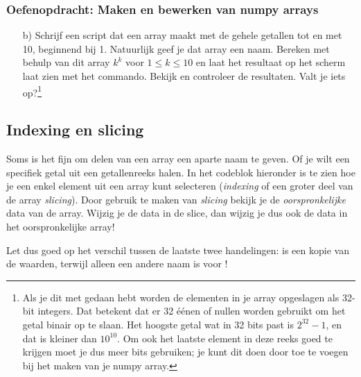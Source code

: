 \documentclass[a4paper,11pt, fleqn]{article}
\begin{document}
\subsubsection*{Oefenopdracht: Maken en bewerken van numpy arrays}
\begin{itemize}
	\item[b)] Schrijf een script dat een array maakt met de gehele getallen tot en met 10, beginnend bij 1. Natuurlijk geef je dat array een naam. Bereken met behulp van dit array $k^k$ voor $1\leq k \leq 10$ en laat het resultaat op het scherm laat zien met het  commando. Bekijk en controleer de resultaten. Valt je iets op?\footnote{Als je dit met  gedaan hebt worden de elementen in je array opgeslagen als 32-bit integers. Dat betekent dat er 32 \'e\'enen of nullen worden gebruikt om het getal binair op te slaan. Het hoogste getal wat in 32 bits past is $2^{32}-1$, en dat is kleiner dan $10^{10}$. Om ook het laatste element in deze reeks goed te krijgen moet je dus meer bits gebruiken; je kunt dit doen door  toe te voegen bij het maken van je numpy array.}
\end{itemize}

\subsection{Indexing en slicing}
Soms is het fijn om delen van een array een aparte naam te geven. Of je wilt een specifiek getal uit een getallenreeks halen. In het codeblok hieronder is te zien hoe je een enkel element uit een array kunt selecteren {(\it indexing} of een groter deel van de array {\it slicing}). Door gebruik te maken van {\it slicing} bekijk je de {\it oorspronkelijke} data van de array. Wijzig je de data in de slice, dan wijzig je dus ook de data in het oorspronkelijke array!


Let dus goed op het verschil tussen de laatste twee handelingen:  is een kopie van de waarden, terwijl  alleen een andere naam is voor !
\end{document}
